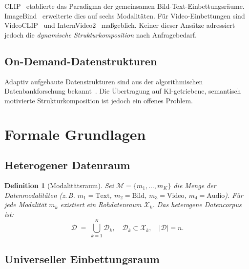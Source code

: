 ﻿\documentclass[12pt,a4paper]{article}
\newtheorem{definition}[theorem]{Definition}
\begin{document}
CLIP~\cite{radford2021clip} etablierte das Paradigma der gemeinsamen 
Bild-Text-Einbet\-tungs\-räume. ImageBind~\cite{girdhar2023imagebind} 
erweiterte dies auf sechs Modalitäten. Für Video-Einbettungen sind 
VideoCLIP~\cite{xu2021videoclip} und InternVideo2~\cite{wang2024internvideo2} 
maßgeblich. Keiner dieser Ansätze adressiert jedoch die 
\emph{dynamische Strukturkomposition} nach Anfragebedarf.

\subsection{On-Demand-Datenstrukturen}

Adaptiv aufgebaute Datenstrukturen sind aus der algorithmischen 
Datenbankforschung bekannt~\cite{idreos2007database}. Die Übertragung 
auf KI-getriebene, semantisch motivierte Strukturkomposition ist 
jedoch ein offenes Problem.

\section{Formale Grundlagen}
\label{sec:grundlagen}

\subsection{Heterogener Datenraum}

\begin{definition}[Modalitätsraum]
\label{def:modalitaet}
Sei $\mathcal{M} = \{m_1, \dots, m_K\}$ die Menge der Datenmodalitäten 
(z.\,B. $m_1 = \text{Text}$, $m_2 = \text{Bild}$, $m_3 = \text{Video}$, 
$m_4 = \text{Audio}$). Für jede Modalität $m_k$ existiert ein 
Rohdatenraum $\mathcal{X}_k$. Das heterogene Datencorpus ist:
\[
  \mathcal{D} \;=\; \bigcup_{k=1}^{K} \mathcal{D}_k,
  \quad \mathcal{D}_k \subset \mathcal{X}_k,
  \quad |\mathcal{D}| = n.
\]
\end{definition}

\subsection{Universeller Einbettungsraum}
\end{document}
